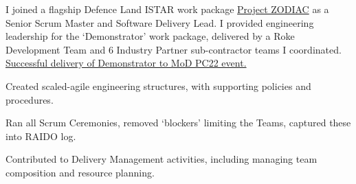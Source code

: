 I joined a flagship Defence Land ISTAR work package \href{https://www.roke.co.uk/news/digitising-land-tactical-istar}{Project ZODIAC} as a Senior Scrum Master and Software Delivery Lead. I provided engineering leadership for the `Demonstrator' work package, delivered by a Roke Development Team and 6 Industry Partner sub-contractor teams I coordinated. \href{https://www.roke.co.uk/news-discover-the-latest-news-and-press-releases-roke/british-army-trusts-roke-to-deliver-40m-contract-for-the-next-phase-of-project-zodiac}{Successful delivery of Demonstrator to MoD PC22 event.}
\vspace{0.25em}
\begin{tightemize}
  \item Created scaled-agile engineering structures, with supporting policies and procedures.
  \item Ran all Scrum Ceremonies, removed `blockers' limiting the Teams, captured these into RAIDO log. 
  \item Contributed to Delivery Management activities, including managing team composition and resource planning.
\end{tightemize}
\sectionsep{}
\vfill{}